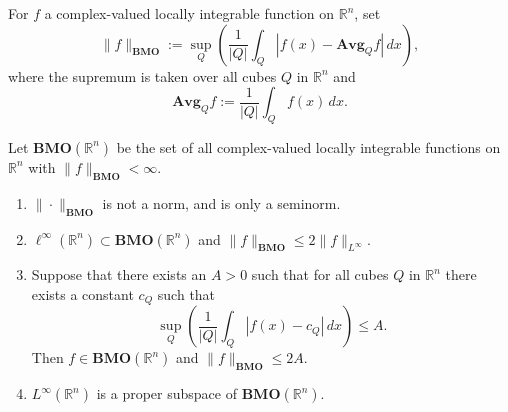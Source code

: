 \begin{exercise}
\label{analysis:2025:6}
For $f$ a complex-valued locally integrable function on $\mathbb{R}^n$, set
\[
\|f\|_{\mathbf{BMO}} := \sup_Q\left(\frac{1}{|Q|}\int_Q|f(x)-\mathbf{Avg}_Q f|\,dx\right),
\]
where the supremum is taken over all cubes $Q$ in $\mathbb{R}^n$ and
\[
\mathbf{Avg}_Q f := \frac{1}{|Q|}\int_Q f(x)\,dx.
\]

Let $\mathbf{BMO}(\mathbb{R}^n)$ be the set of all complex-valued locally integrable functions on $\mathbb{R}^n$ with $\|f\|_{\mathbf{BMO}}<\infty$.

\begin{enumerate}
\item[(1)] $\|\cdot\|_{\mathbf{BMO}}$ is not a norm, and is only a seminorm.
\item[(2)] $\ell^{\infty}(\mathbb{R}^n)\subset\mathbf{BMO}(\mathbb{R}^n)$ and $\|f\|_{\mathbf{BMO}} \leq 2\|f\|_{L^{\infty}}$.
\item[(3)] Suppose that there exists an $A>0$ such that for all cubes $Q$ in $\mathbb{R}^n$ there exists a constant $c_Q$ such that
\[
\sup_Q\left(\frac{1}{|Q|}\int_Q|f(x)-c_Q|\,dx\right) \leq A.
\]
Then $f\in\mathbf{BMO}(\mathbb{R}^n)$ and $\|f\|_{\mathbf{BMO}} \leq 2A$.
\item[(4)] $L^{\infty}(\mathbb{R}^n)$ is a proper subspace of $\mathbf{BMO}(\mathbb{R}^n)$.
\end{enumerate}
\end{exercise}

